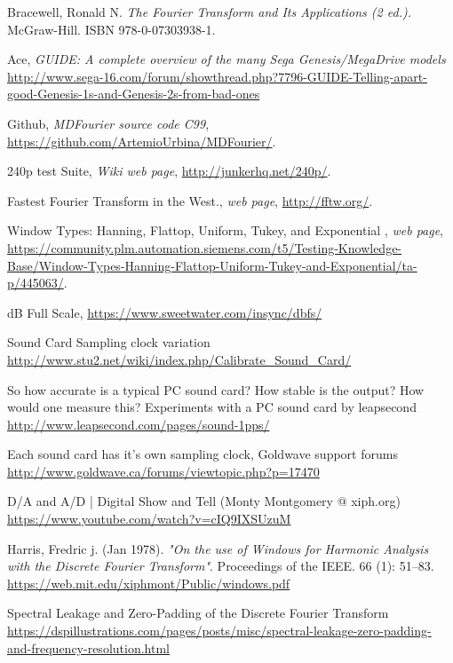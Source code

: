 \documentclass[10pt,a4paper]{report}
\begin{document}
\begin{thebibliography}{9}
	Bracewell, Ronald N. 
	\textit{The Fourier Transform and Its Applications (2 ed.).}
	McGraw-Hill. ISBN 978-0-07303938-1.
	
	Ace, \textit{GUIDE: A complete overview of the many Sega Genesis/MegaDrive models}
	\url{http://www.sega-16.com/forum/showthread.php?7796-GUIDE-Telling-apart-good-Genesis-1s-and-Genesis-2s-from-bad-ones}
	
	Github,
	\textit{MDFourier source code C99},
	\url{https://github.com/ArtemioUrbina/MDFourier/}.
	
	240p test Suite,
	\textit{Wiki web page},
	\url{http://junkerhq.net/240p/}.
	
	Fastest Fourier Transform in the West.,
	\textit{web page},
	\url{http://fftw.org/}.
	
	Window Types: Hanning, Flattop, Uniform, Tukey, and Exponential ,
	\textit{web page},
	\url{https://community.plm.automation.siemens.com/t5/Testing-Knowledge-Base/Window-Types-Hanning-Flattop-Uniform-Tukey-and-Exponential/ta-p/445063/}.
	
	dB Full Scale, 
	\url{https://www.sweetwater.com/insync/dbfs/}
	
	Sound Card Sampling clock variation
	\url{http://www.stu2.net/wiki/index.php/Calibrate_Sound_Card/}
	
	So how accurate is a typical PC sound card? How stable is the output? How would one measure this?
	Experiments with a PC sound card by leapsecond
	\url{http://www.leapsecond.com/pages/sound-1pps/}
	
	Each sound card has it's own sampling clock, Goldwave support forums
	\url{http://www.goldwave.ca/forums/viewtopic.php?p=17470}
	
	D/A and A/D | Digital Show and Tell (Monty Montgomery @ xiph.org)
	\url{https://www.youtube.com/watch?v=cIQ9IXSUzuM}
	
	Harris, Fredric j. (Jan 1978). \textit{"On the use of Windows for Harmonic Analysis with the Discrete Fourier Transform"}. Proceedings of the IEEE. 66 (1): 51–83.
	\url{https://web.mit.edu/xiphmont/Public/windows.pdf}
	
	Spectral Leakage and Zero-Padding of the Discrete Fourier Transform
	\url{https://dspillustrations.com/pages/posts/misc/spectral-leakage-zero-padding-and-frequency-resolution.html}
	

\end{thebibliography}
\end{document}
